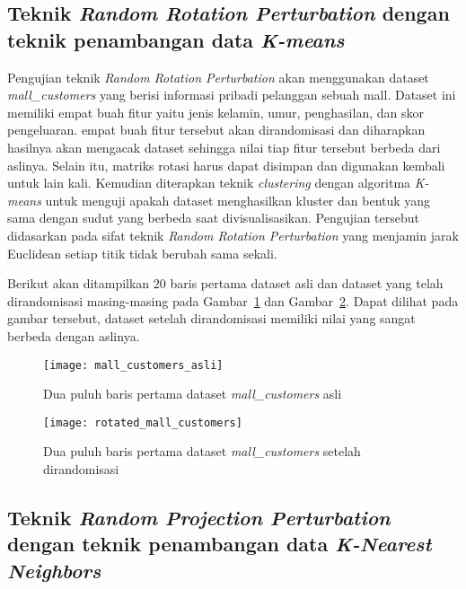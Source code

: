 \subsection{Teknik \textit{Random Rotation Perturbation} dengan teknik penambangan data \textit{K-means}}
\label{sec:rrp-kmeans}

Pengujian teknik \textit{Random Rotation Perturbation} akan menggunakan dataset \textit{mall\_customers} yang berisi informasi pribadi pelanggan sebuah mall. Dataset ini memiliki empat buah fitur yaitu jenis kelamin, umur, penghasilan, dan skor pengeluaran. empat buah fitur tersebut akan dirandomisasi dan diharapkan hasilnya akan mengacak dataset sehingga nilai tiap fitur tersebut berbeda dari aslinya. Selain itu, matriks rotasi harus dapat disimpan dan digunakan kembali untuk lain kali. Kemudian diterapkan teknik \textit{clustering} dengan algoritma \textit{K-means} untuk menguji apakah dataset menghasilkan kluster dan bentuk yang sama dengan sudut yang berbeda saat divisualisasikan. Pengujian tersebut didasarkan pada sifat teknik \textit{Random Rotation Perturbation} yang menjamin jarak Euclidean setiap titik tidak berubah sama sekali.

Berikut akan ditampilkan 20 baris pertama dataset asli dan dataset yang telah dirandomisasi masing-masing pada Gambar~\ref{fig:mall_customers_asli} dan Gambar~\ref{fig:rotated_mall_customers}. Dapat dilihat pada gambar tersebut, dataset setelah dirandomisasi memiliki nilai yang sangat berbeda dengan aslinya.

\begin{figure}
	\centering
	\texttt{[image: mall\_customers\_asli]}
	\caption{Dua puluh baris pertama dataset \textit{mall\_customers} asli}
	\label{fig:mall_customers_asli}
\end{figure}

\begin{figure}
	\centering
	\texttt{[image: rotated\_mall\_customers]}
	\caption{Dua puluh baris pertama dataset \textit{mall\_customers} setelah dirandomisasi}
	\label{fig:rotated_mall_customers}
\end{figure}

\subsection{Teknik \textit{Random Projection Perturbation} dengan teknik penambangan data \textit{K-Nearest Neighbors}}
\label{sec:rpp-knn}

